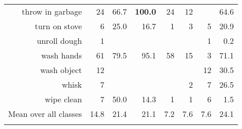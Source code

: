 \begin{tabular}{r r r@{\ \ }r@{\ \ }r@{\ \ }r@{\ \ }r r}
throw in garbage & 24 & 66.7 & \textbf{100.0} & 24 & 12 &  & 64.6 \\
turn on stove & 6 & 25.0 & 16.7 & 1 & 3 & 5 & 20.9 \\
unroll dough & 1 &  &  &  &  & 1 & 0.2 \\
wash hands & 61 & 79.5 & 95.1 & 58 & 15 & 3 & 71.1 \\
wash object & 12 &  &  &  &  & 12 & 30.5 \\
whisk & 7 &  &  &  & 2 & 7 & 26.5 \\
wipe clean & 7 & 50.0 & 14.3 & 1 & 1 & 6 & 1.5 \\
\cmidrule(lr){1-1} \cmidrule(lr){2-2} \cmidrule(lr){3-7} \cmidrule(lr){8-8}
Mean over all classes&14.8&21.4&21.1&7.2&7.6&7.6&24.1
\\ \bottomrule \\ \end{tabular}
